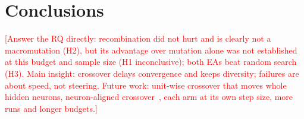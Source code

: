\documentclass[sigconf,nonacm]{acmart}
\newcommand{\todo}[1]{\textcolor{red}{[#1]}}
\begin{document}
\section{Conclusions}
\todo{Answer the RQ directly: recombination did not hurt and is clearly not a macromutation (H2), but its advantage over mutation alone was not established at this budget and sample size (H1 inconclusive); both EAs beat random search (H3). Main insight: crossover delays convergence and keeps diversity; failures are about speed, not steering. Future work: unit-wise crossover that moves whole hidden neurons, neuron-aligned crossover~\cite{uriot2020}, each arm at its own step size, more runs and longer budgets.}



\end{document}
